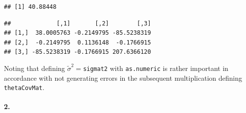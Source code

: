 \documentclass[
]{article}
\newenvironment{Shaded}{\begin{snugshade}}{\end{snugshade}}
\newcommand{\KeywordTok}[1]{\textcolor[rgb]{0.13,0.29,0.53}{\textbf{#1}}}
\newcommand{\NormalTok}[1]{#1}
\newcommand{\OperatorTok}[1]{\textcolor[rgb]{0.81,0.36,0.00}{\textbf{#1}}}
\newcommand{\StringTok}[1]{\textcolor[rgb]{0.31,0.60,0.02}{#1}}
\begin{document}
\begin{Shaded}
\end{Shaded}

\begin{verbatim}
## [1] 40.88448
\end{verbatim}

\begin{Shaded}
\end{Shaded}

\begin{verbatim}
##             [,1]       [,2]        [,3]
## [1,]  38.0005763 -0.2149795 -85.5238319
## [2,]  -0.2149795  0.1136148  -0.1766915
## [3,] -85.5238319 -0.1766915 207.6366120
\end{verbatim}

Noting that defining \(\tilde\sigma^2=\)\texttt{sigmat2} with
\texttt{as.numeric} is rather important in accordance with not
generating errors in the subsequent multiplication defining
\texttt{thetaCovMat}.

\hypertarget{section-96}{%
\paragraph{\texorpdfstring{\textbf{2.}}{2.}}\label{section-96}}
\end{document}
